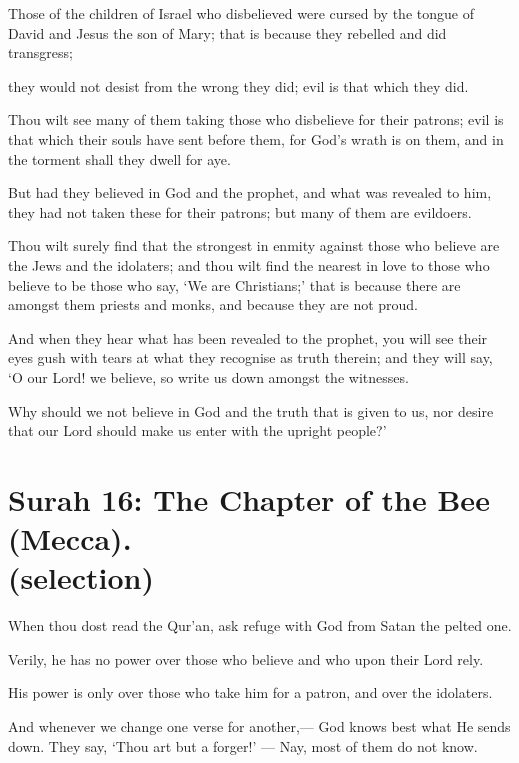 \documentclass[fontsize=14pt, letterpaper, notitlepage, openany, DIV=12]{scrbook} %
\begin{document}
\noindent[5:78]
Those of the children of Israel who disbelieved were cursed by the tongue of David and
Jesus the son of Mary; that is because they rebelled and did transgress;

\noindent[5:79]
they would not desist from the wrong they did; evil is that which they did.

\noindent[5:80]
Thou wilt see many of them taking those who disbelieve for their patrons; evil is that
which their souls have sent before them, for God's wrath is on them, and in the torment shall
they dwell for aye.

\noindent[5:81]
But had they believed in God and the prophet, and what was revealed to him, they had
not taken these for their patrons; but many of them are evildoers.

\noindent[5:82]
Thou wilt surely find that the strongest in enmity against those who believe are the Jews
and the idolaters; and thou wilt find the nearest in love to those who believe to be those who say,
`We are Christians;' that is because there are amongst them priests and monks, and because they
are not proud.

\noindent[5:83]
And when they hear what has been revealed to the prophet, you will see their eyes gush
with tears at what they recognise as truth therein; and they will say, `O our Lord! we believe, so
write us down amongst the witnesses.

\noindent[5:84]
Why should we not believe in God and the truth that is given to us, nor desire that our
Lord should make us enter with the upright people?'


\section[Surah 16: The Chapter of the Bee (Mecca).]{Surah 16: The Chapter of the Bee (Mecca).\\ (selection)}


\noindent[16:98]
When thou dost read the Qur'an, ask refuge with God from Satan the pelted one.

\noindent[16:99]
Verily, he has no power over those who believe and who upon their Lord rely.

\noindent[16:100]
His power is only over those who take him for a patron, and over the idolaters.

\noindent[16:101]
And whenever we change one verse for another,--- God knows best what He sends down.
They say, `Thou art but a forger!' --- Nay, most of them do not know.
\end{document}
